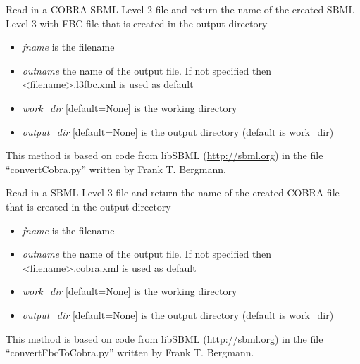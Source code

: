 \documentclass[a4paper,11pt,english]{sphinxmanual}
\begin{document}
\begin{fulllineitems}
\label{modules_doc:cbmpy.CBXML.sbml_convertCOBRASBMLtoFBC}
Read in a COBRA SBML Level 2 file and return the name of the created SBML Level 3 with FBC
file that is created in the output directory
\begin{itemize}
\item {} 
\emph{fname} is the filename

\item {} 
\emph{outname} the name of the output file. If not specified then \textless{}filename\textgreater{}.l3fbc.xml is used as default

\item {} 
\emph{work\_dir} {[}default=None{]} is the working directory

\item {} 
\emph{output\_dir} {[}default=None{]} is the output directory (default is work\_dir)

\end{itemize}

This method is based on code from libSBML (\url{http://sbml.org}) in the file ``convertCobra.py''
written by Frank T. Bergmann.

\end{fulllineitems}


\begin{fulllineitems}
\label{modules_doc:cbmpy.CBXML.sbml_convertSBML3FBCToCOBRA}
Read in a SBML Level 3 file and return the name of the created COBRA
file that is created in the output directory
\begin{itemize}
\item {} 
\emph{fname} is the filename

\item {} 
\emph{outname} the name of the output file. If not specified then \textless{}filename\textgreater{}.cobra.xml is used as default

\item {} 
\emph{work\_dir} {[}default=None{]} is the working directory

\item {} 
\emph{output\_dir} {[}default=None{]} is the output directory (default is work\_dir)

\end{itemize}

This method is based on code from libSBML (\url{http://sbml.org}) in the file ``convertFbcToCobra.py''
written by Frank T. Bergmann.

\end{fulllineitems}
\end{document}
